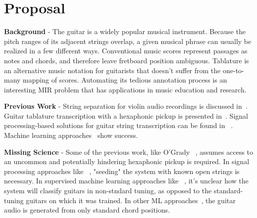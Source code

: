 \documentclass[12pt]{cmuthesis}
\begin{document}
\mainmatter


%
%
%
%
%
\chapter{Proposal}
\noindent
\textbf{Background} - The guitar is a widely popular musical instrument. Because the pitch ranges of its adjacent strings overlap, a given musical phrase can usually be realized in a few different ways. Conventional music scores represent passages as notes and chords, and therefore leave fretboard position ambiguous. Tablature is an alternative music notation for guitarists that doesn't suffer from the one-to-many mapping of scores. Automating its tedious annotation process is an interesting MIR problem that has applications in music education and research.

\noindent
\textbf{Previous Work} - String separation for violin audio recordings is discussed in~\cite{maezawa2009}. Guitar tablature transcription with a hexaphonic pickup is presented in~\cite{ogrady2009}. Signal processing-based solutions for guitar string transcription can be found in ~\cite{barbanchoa2012,barbanchoi2012}. Machine learning approaches~\cite{barbancho2009, abesser2012, kehling2014} show success.

\noindent
\textbf{Missing Science} - Some of the previous work, like O'Grady ~\cite{ogrady2009}, assumes access to an uncommon and potentially hindering hexaphonic pickup is required. In signal processing approaches like ~\cite{barbanchoi2012}, "seeding" the system with known open strings is necessary. In supervised machine learning approaches like ~\cite{abesser2012, kehling2014}, it's unclear how the system will classify guitars in non-stndard tuning, as opposed to the standard-tuning guitars on which it was trained. In other ML approaches~\cite{barbancho2009}, the guitar audio is generated from only standard chord positions. 
\end{document}
